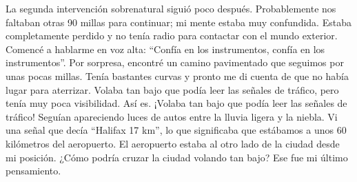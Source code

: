 \documentclass[twoside, 12pt]{book}
\begin{document}
La segunda intervención sobrenatural siguió poco después. Probablemente nos faltaban otras 90 millas para continuar; mi mente estaba muy confundida. Estaba completamente perdido y no tenía radio para contactar con el mundo exterior. Comencé a hablarme en voz alta: “Confía en los instrumentos, confía en los instrumentos”. Por sorpresa, encontré un camino pavimentado que seguimos por unas pocas millas. Tenía bastantes curvas y pronto me di cuenta de que no había lugar para aterrizar. Volaba tan bajo que podía leer las señales de tráfico, pero tenía muy poca visibilidad. Así es. ¡Volaba tan bajo que podía leer las señales de tráfico! Seguían apareciendo luces de autos entre la lluvia ligera y la niebla. Vi una señal que decía “Halifax 17 km”, lo que significaba que estábamos a unos 60 kilómetros del aeropuerto. El aeropuerto estaba al otro lado de la ciudad desde mi posición. ¿Cómo podría cruzar la ciudad volando tan bajo? Ese fue mi último pensamiento.\\
\end{document}
